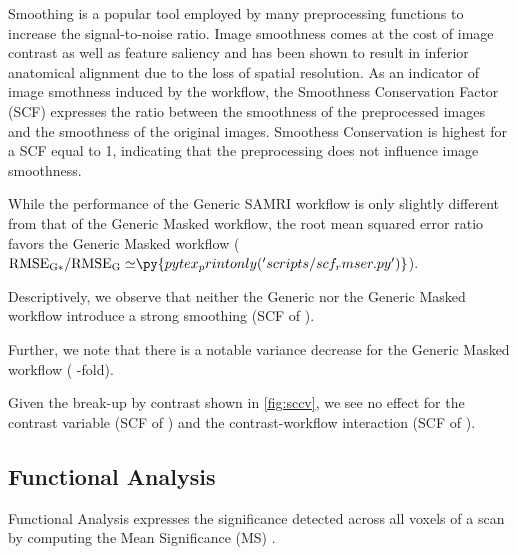 
Smoothing is a popular tool employed by many preprocessing functions to increase the signal-to-noise ratio.
Image smoothness comes at the cost of image contrast as well as feature saliency and has been shown to result in inferior anatomical alignment \cite{fmriprep} due to the loss of spatial resolution.
As an indicator of image smothness induced by the workflow, the Smoothness Conservation Factor (SCF) \cite{ioanas_optimized_2019} expresses the ratio between the smoothness of the preprocessed images and the smoothness of the original images.
Smoothess Conservation is highest for a SCF equal to 1, indicating that the preprocessing does not influence image smoothness.

While the performance of the Generic SAMRI workflow is only slightly different from that of the Generic Masked workflow, the root mean squared error ratio favors the Generic Masked workflow ($\mathrm{RMSE_{G*}/RMSE_{G}\simeq} \py{pytex_printonly('scripts/scf_rmser.py')}$).

Descriptively, we observe that neither the Generic nor the Generic Masked workflow introduce a strong smoothing (SCF of ).

Further, we note that there is a notable variance decrease for the Generic Masked workflow
(
-fold).

Given the break-up by contrast shown in \cref{fig:sccv}, we see no effect for the contrast variable
(SCF of )
and the contrast-workflow interaction
(SCF of ).

\subsection{Functional Analysis}

Functional Analysis expresses the significance detected across all voxels of a scan by computing the Mean Significance (MS) \cite{ioanas_optimized_2019}.

